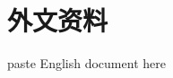 

\renewcommand{\figurename}{Fig}                                    %
\renewcommand{\thefigure}{\arabic{figure}}       %
\renewcommand{\theequation}{\arabic{equation}}
\appendix
\chapter*{外文资料}
\setcounter{equation}{0}
\par{paste English document here}

\thispagestyle{empty}
